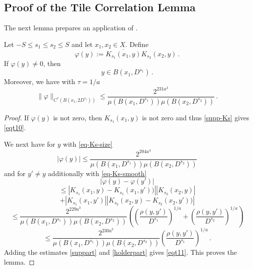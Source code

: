 \subsection{Proof of the Tile Correlation Lemma}\label{sec-tile-operator}

The next lemma prepares an application of
.
\begin{lemma}\label{correlation-kernel-bound}
\leanok
{}
Let $-S\le s_1\le s_2\le S$ and let $x_1,x_2\in X$.
Define \begin{equation}
 \varphi(y) := \overline{K_{s_1}(x_1, y)}
 K_{s_2}(x_2, y) \, .
\end{equation}
If $\varphi(y)\neq 0$, then
\begin{equation}\label{eqt10}
    y\in B(x_1, D^{s_1})\, .
\end{equation}
Moreover, we have with $\tau = 1/a$
\begin{equation}\label{eqt11}
  \|\varphi\|_{C^\tau(B(x_1, 2 D^{s_1}))}\le
\frac{2^{231 a^3}}{\mu(B(x_1, D^{s_1}))\mu(B(x_2, D^{s_2}))}
      \, .
\end{equation}

\end{lemma}
\begin{proof}
\leanok

If $\varphi(y)$ is not zero, then $K_{s_1}(x_1, y)$ is not zero and thus
\eqref{supp-Ks} gives \eqref{eqt10}.

We next have for $y$ with \eqref{eq-Ks-size}
\begin{equation}\label{suppart}
    |\varphi(y)|\le
    \frac{2^{204 a^3}}{\mu(B(x_1, D^{s_1}))\mu(B(x_2, D^{s_2}))}
\end{equation}
and for $y'\neq y$ additionally with \eqref{eq-Ks-smooth}
\begin{equation}
    |\varphi(y)-\varphi(y')|
 \end{equation}
 \begin{equation}
 \le
 |K_{s_1}(x_1,y)-K_{s_1}(x_1,y'))||
 K_{s_2}(x_2, y)|
\end{equation}
 \begin{equation}+|K_{s_1}(x_1, y')|
 |K_{s_2}(x_2, y) - K_{s_2}(x_2, y'))|
\end{equation}
\begin{equation}
      \le \frac{2^{229 a^3}}{\mu(B(x_1, D^{s_1}))\mu(B(x_2, D^{s_2}))}
       \left(\left(\frac{ \rho(y,y')}{D^{s_1}}\right)^{1/a}+
       \left(\frac{ \rho(y,y')}{D^{s_2}}\right)^{1/a}\right)
\end{equation}
\begin{equation}\label{holderpart}
      \le \frac{2^{230 a^3}}{\mu(B(x_1, D^{s_1}))\mu(B(x_2, D^{s_2}))}
       \left(\frac{ \rho(y,y')}{D^{s_1}}\right)^{1/a}\,.
\end{equation}
Adding the estimates \eqref{suppart} and \eqref{holderpart} gives \eqref{eqt11}.
This proves the lemma.
\end{proof}

